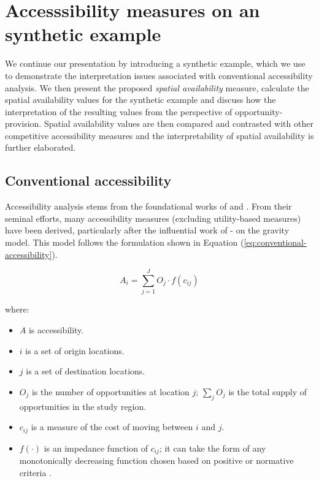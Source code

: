\documentclass[]{elsarticle} %
\providecommand{\tightlist}{%
  \setlength{\itemsep}{0pt}\setlength{\parskip}{0pt}}
\begin{document}
\hypertarget{background}{%
\section{Accesssibility measures on an synthetic
example}\label{background}}

We continue our presentation by introducing a synthetic example, which
we use to demonstrate the interpretation issues associated with
conventional accessibility analysis. We then present the proposed
\emph{spatial availability} measure, calculate the spatial availability
values for the synthetic example and discuss how the interpretation of
the resulting values from the perspective of opportunity-provision.
Spatial availability values are then compared and contrasted with other
competitive accessibility measures
\citep{shen1998, luo2003, horner_exploring_2004, allen2019} and the
interpretability of spatial availability is further elaborated.

\hypertarget{conventional-accessibility}{%
\subsection{Conventional
accessibility}\label{conventional-accessibility}}

Accessibility analysis stems from the foundational works of
\citeyearpar{harris_market_1954} and \citeyearpar{hansen1959}. From
their seminal efforts, many accessibility measures (excluding
utility-based measures) have been derived, particularly after the
influential work of -\citet{wilson1971} on the gravity model. This model
follows the formulation shown in Equation
(\ref{eq:conventional-accessibility}).

\begin{equation}
\label{eq:conventional-accessibility}
A_i = \sum_{j=1}^JO_j \cdot f(c_{ij})
\end{equation}

\noindent where:

\begin{itemize}
\tightlist
\item
  \(A\) is accessibility.
\item
  \(i\) is a set of origin locations.
\item
  \(j\) is a set of destination locations.
\item
  \(O_j\) is the number of opportunities at location \(j\);
  \(\sum_j O_j\) is the total supply of opportunities in the study
  region.
\item
  \(c_{ij}\) is a measure of the cost of moving between \(i\) and \(j\).
\item
  \(f(\cdot)\) is an impedance function of \(c_{ij}\); it can take the
  form of any monotonically decreasing function chosen based on positive
  or normative criteria \citep{paez2012measuring}.
\end{itemize}
\end{document}
